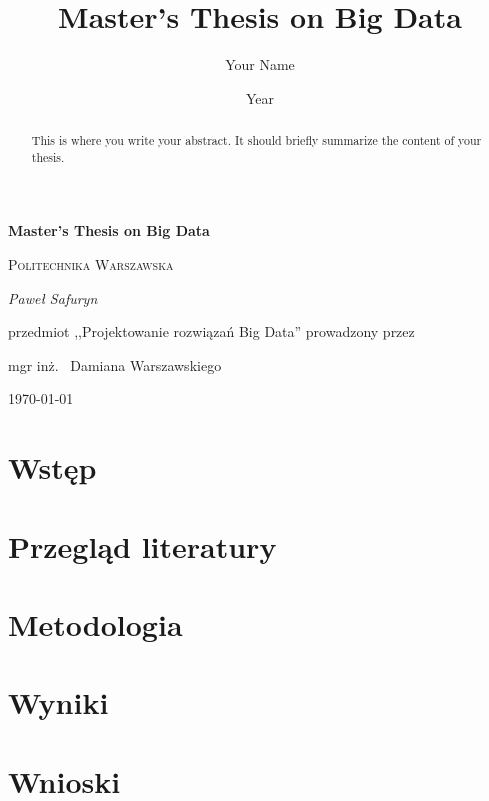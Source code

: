 \documentclass[12pt, a4paper]{article}
\title{Master's Thesis on Big Data}
\author{Your Name}
\date{Year}
\begin{document}
\begin{titlepage}
\centering
\vspace*{1cm}
{\huge\bfseries Master's Thesis on Big Data\par}
\vspace{1.5cm}
{\scshape\LARGE Politechnika Warszawska \par}
\vspace{1.5cm}
{\itshape Paweł Safuryn\par}
\vfill
przedmiot ,,Projektowanie rozwiązań Big Data'' prowadzony przez \par
mgr inż. ~Damiana Warszawskiego

\vfill

{\large \today\par}
\end{titlepage}

\begin{abstract}
This is where you write your abstract. It should briefly summarize the content of your thesis.
\end{abstract}
\newpage

\tableofcontents
\newpage

\section{Wstęp}

\section{Przegląd literatury}

\section{Metodologia}

\section{Wyniki}

\section{Wnioski}

\nocite{*} %



\end{document}
